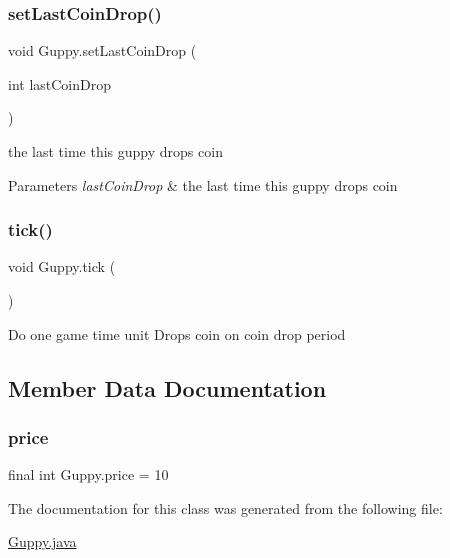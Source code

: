 \subsubsection{\texorpdfstring{set\+Last\+Coin\+Drop()}{setLastCoinDrop()}}
{\footnotesize\ttfamily void Guppy.\+set\+Last\+Coin\+Drop (\begin{DoxyParamCaption}\item[{int}]{last\+Coin\+Drop }\end{DoxyParamCaption})\hspace{0.3cm}{\ttfamily [inline]}}

the last time this guppy drops coin 
\begin{DoxyParams}{Parameters}
{\em last\+Coin\+Drop} & the last time this guppy drops coin \\
\hline
\end{DoxyParams}
\mbox{\label{class_guppy_a9533589560539acbdfbccc32bd6a66b3}} 
\subsubsection{\texorpdfstring{tick()}{tick()}}
{\footnotesize\ttfamily void Guppy.\+tick (\begin{DoxyParamCaption}{ }\end{DoxyParamCaption})\hspace{0.3cm}{\ttfamily [inline]}}

Do one game time unit Drops coin on coin drop period 

\subsection{Member Data Documentation}
\mbox{\label{class_guppy_a711b1ce05b2a4e55af2bbab10876a56d}} 
\subsubsection{\texorpdfstring{price}{price}}
{\footnotesize\ttfamily final int Guppy.\+price = 10\hspace{0.3cm}{\ttfamily [static]}}



The documentation for this class was generated from the following file\+:\begin{DoxyCompactItemize}
\item 
\mbox{\hyperlink{_guppy_8java}{Guppy.\+java}}\end{DoxyCompactItemize}
